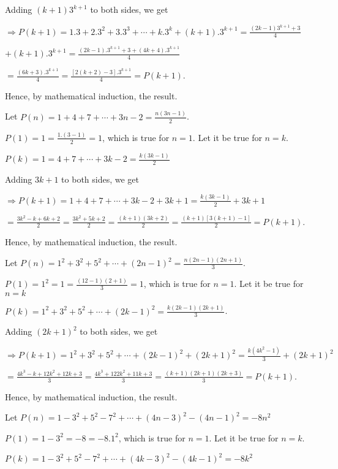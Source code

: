   Adding $(k + 1)3^{k + 1}$ to both sides, we get

  $\Rightarrow P(k + 1) = 1.3 + 2.3^2 + 3.3^3 + \cdots + k.3^k + (k + 1).3^{k + 1} = \frac{(2k - 1)3^{k + 1}
    + 3}{4}$\

  $+ (k
  + 1).3^{k + 1} = \frac{(2k - 1).3^{k + 1} + 3 + (4k + 4).3^{k + 1}}{4}$

  $= \frac{(6k + 3).3^{k + 1}}{4} = \frac{[2(k + 2) - 3].3^{k + 1}}{4} = P(k + 1)$.

  Hence, by mathematical induction, the result.
\item Let $P(n) = 1 + 4 + 7 + \cdots + 3n - 2 = \frac{n(3n - 1)}{2}$.

  $P(1) =  1 = \frac{1.(3 - 1)}{2} = 1$, which is true for $n = 1$. Let it be true for $n = k$.

  $P(k) = 1 = 4 + 7 + \cdots + 3k - 2 = \frac{k(3k - 1)}{2}$

  Adding $3k + 1$ to both sides, we get

  $\Rightarrow P(k + 1) = 1 + 4 + 7 + \cdots + 3k - 2 + 3k + 1 = \frac{k(3k - 1)}{2} + 3k + 1$

  $= \frac{3k^2 -
  k + 6k + 2}{2} = \frac{3k^2 + 5k + 2}{2} = \frac{(k + 1)(3k + 2)}{2} = \frac{(k + 1)[3(k + 1) - 1]}{2} =
  P(k + 1)$.

  Hence, by mathematical induction, the result.
\item Let $P(n) = 1^2 + 3^2 + 5^2 + \cdots + (2n - 1)^2 = \frac{n(2n - 1)(2n + 1)}{3}$.

  $P(1) = 1^2 = 1 = \frac{(12 - 1)(2 + 1)}{3} = 1$, which is true for $n = 1$. Let it be true for $n = k$

  $P(k) = 1^2 + 3^2 + 5^2 + \cdots + (2k - 1)^2 = \frac{k(2k - 1)(2k + 1)}{3}$.

  Adding $(2k + 1)^2$ to both sides, we get

  $\Rightarrow P(k + 1) = 1^2 + 3^2 + 5^2 + \cdots + (2k - 1)^2 + (2k + 1)^2 = \frac{k(4k^2 - 1)}{3} + (2k +
  1)^2$

  $= \frac{4k^3 - k + 12k^2 + 12k + 3}{3} = \frac{4k^3 + 122k^2 + 11k + 3}{3} = \frac{(k + 1)(2k + 1)(2k
    + 3)}{3} = P(k + 1)$.

  Hence, by mathematical induction, the result.
\item Let $P(n) = 1 - 3^2 + 5^2 - 7^2 + \cdots + (4n - 3)^2 - (4n - 1)^2 = -8n^2$

  $P(1) = 1 - 3^2 = -8 = -8.1^2$, which is true for $n = 1$. Let it be true for $n = k$.

  $P(k) = 1 - 3^2 + 5^2 - 7^2 + \cdots + (4k - 3)^2 - (4k - 1)^2 = -8k^2$

